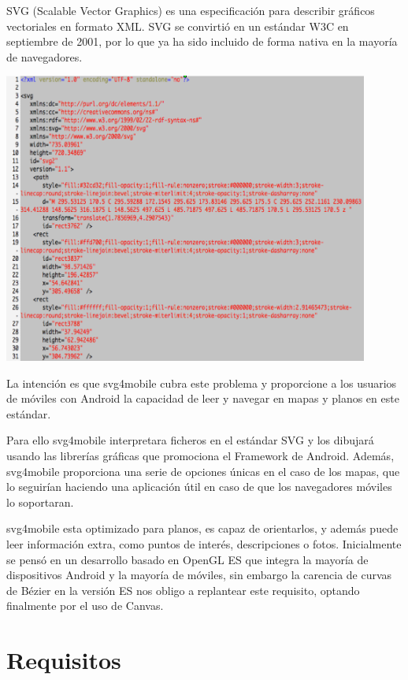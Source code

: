 \documentclass[a4paper,10pt]{article}
\begin{document}
SVG (Scalable Vector Graphics) es una especificación para describir gráficos vectoriales en formato XML. SVG se convirtió en un estándar W3C en septiembre de 2001, por lo que ya ha sido incluido de forma nativa en la mayoría de navegadores.


\begin{center}
 \includegraphics[width=12cm]{svg_sample.png}
\end{center}


La intención es que svg4mobile cubra este problema y proporcione a los usuarios de móviles con Android la capacidad de leer y navegar en mapas y planos en este estándar.

Para ello svg4mobile  interpretara ficheros en el estándar SVG y los dibujará usando las librerías gráficas que promociona el Framework de Android.
Además, svg4mobile proporciona una serie de opciones únicas en el caso de los mapas, que lo seguirían haciendo una aplicación útil en caso de que los navegadores móviles lo soportaran.

svg4mobile esta optimizado para planos, es capaz de orientarlos, y además puede leer información extra, como puntos de interés, descripciones o fotos.
Inicialmente se pensó en un desarrollo basado en OpenGL ES que integra la mayoría de dispositivos Android y la mayoría de móviles, sin embargo la carencia de curvas de Bézier en la versión ES nos obligo a replantear este requisito, optando finalmente por el uso de Canvas.

\section{Requisitos}
\end{document}
